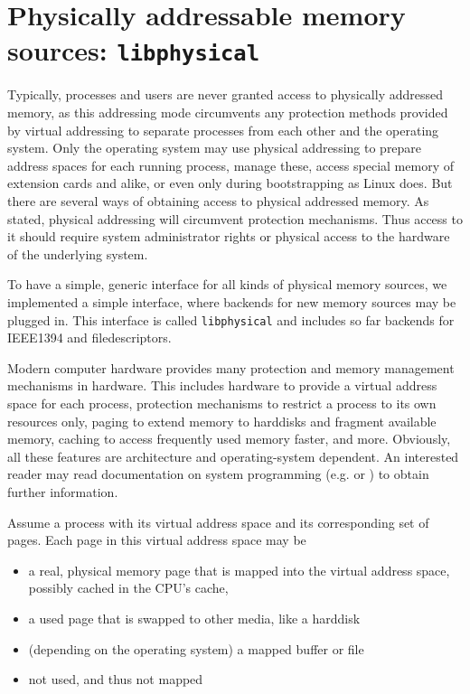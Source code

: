 %
%

\section{Physically addressable memory sources: \texttt{libphysical}}

\label{memsources}

Typically, processes and users are never granted access to physically addressed
memory, as this addressing mode circumvents any protection methods provided by
virtual addressing to separate processes from each other and the operating
system. Only the operating system may use physical addressing to prepare address
spaces for each running process, manage these, access special memory of
extension cards and alike, or even only during bootstrapping as Linux does. But
there are several ways of obtaining access to physical addressed memory. As
stated, physical addressing will circumvent protection mechanisms.  Thus access
to it should require system administrator rights or physical access to the
hardware of the underlying system.

To have a simple, generic interface for all kinds of physical memory sources, we
implemented a simple interface, where backends for new memory sources may be
plugged in. This interface is called \texttt{libphysical} and includes so far
backends for IEEE1394 and filedescriptors.

Modern computer hardware provides many protection and memory management
mechanisms in hardware. This includes hardware to provide a virtual address
space for each process, protection mechanisms to restrict a process to its own
resources only, paging to extend memory to harddisks and fragment available
memory, caching to access frequently used memory faster, and more. Obviously,
all these features are architecture and operating-system dependent. An
interested reader may read documentation on system programming (e.g.
\cite{rwth_syspro_scriptum:2002} or \cite{IA32_SDM_3a:2006,IA32_SDM_3b:2006}) to
obtain further information.

Assume a process with its virtual address space and its corresponding set of
pages. Each page in this virtual address space may be

\begin{itemize}

	\item a real, physical memory page that is mapped into the virtual 
		address space, possibly cached in the CPU's cache,

	\item a used page that is swapped to other media, like a harddisk

	\item (depending on the operating system) a mapped buffer or file

	\item not used, and thus not mapped

\end{itemize}


